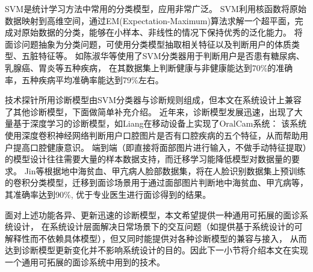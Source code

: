 SVM\cite{cortes1995support}是统计学习方法中常用的分类模型，应用非常广泛。
SVM利用核函数将原始数据映射到高维空间，通过EM(Expectation-Maximum)算法求解一个超平面，完成对原始数据的分类，能够在小样本、非线性的情况下保持优秀的泛化能力。
将面诊问题抽象为分类问题，可使用分类模型抽取相关特征以及判断用户的体质类型、五脏特征等。
如陈淑华等\cite{chen2016facial}使用了SVM分类器\cite{cortes1995support}用于判断用户是否患有糖尿病、乳腺癌、胃炎等五种疾病，
在其数据集上判断健康与非健康能达到70\%的准确率，五种疾病平均准确率能达到79\%左右。

技术探针所用诊断模型由SVM分类器与诊断规则组成，但本文在系统设计上兼容了其他诊断模型，下面做简单补充介绍。
近年来，诊断模型发展迅速，出现了大量基于深度学习的诊断模型，如Liang\cite{liang2020oralcam}在移动设备上实现了OralCam系统：
该系统使用深度卷积神经网络判断用户口腔图片是否有口腔疾病的五个特征，从而帮助用户提高口腔健康意识。
端到端（即直接将面部图片进行输入，不做手动特征提取）的模型设计往往需要大量的样本数据支持，而迁移学习能降低模型对数据量的要求。
Jin\cite{jin2020deep}等根据地中海贫血、甲亢病人脸部数据集，将在人脸识别数据集上预训练的卷积分类模型，迁移到面诊场景用于通过面部图片判断地中海贫血、甲亢病等，
其准确率达到90\%, 优于专业医生进行面诊得到的结果。

面对上述功能各异、更新迅速的诊断模型，本文希望提供一种通用可拓展的面诊系统设计，
在系统设计层面解决日常场景下的交互问题（如提供基于系统设计的可解释性而不依赖具体模型），但又同时能提供对各种诊断模型的兼容与接入，
从而达到诊断模型更新变化并不影响系统设计的目的。因此下一小节将介绍本文在实现一个通用可拓展的面诊系统中用到的技术。


